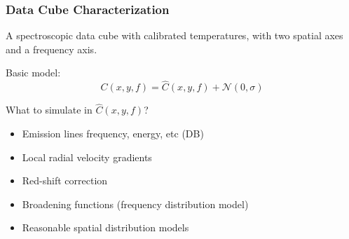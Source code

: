 \documentclass[slidestop,compress,mathserif,color,12pt]{beamer}
\begin{document}
\begin{frame}
  \frametitle{Data Cube Characterization}
\scriptsize
\begin{minipage}{0.65\linewidth}
A spectroscopic data cube with calibrated temperatures,
with two spatial axes 
and a frequency axis.

Basic model:
\begin{equation}
C(x,y,f) = \hat{C}(x,y,f) + \mathcal{N}(0,\sigma)
\end{equation}

What to simulate in $\hat{C}(x,y,f)$?
\begin{itemize}
\item Emission lines frequency, energy, etc (DB)
\item Local radial velocity gradients
\item Red-shift correction
\item Broadening functions (frequency distribution model)
\item Reasonable spatial distribution models
\end{itemize}




\end{minipage}
\end{frame}
\end{document}
